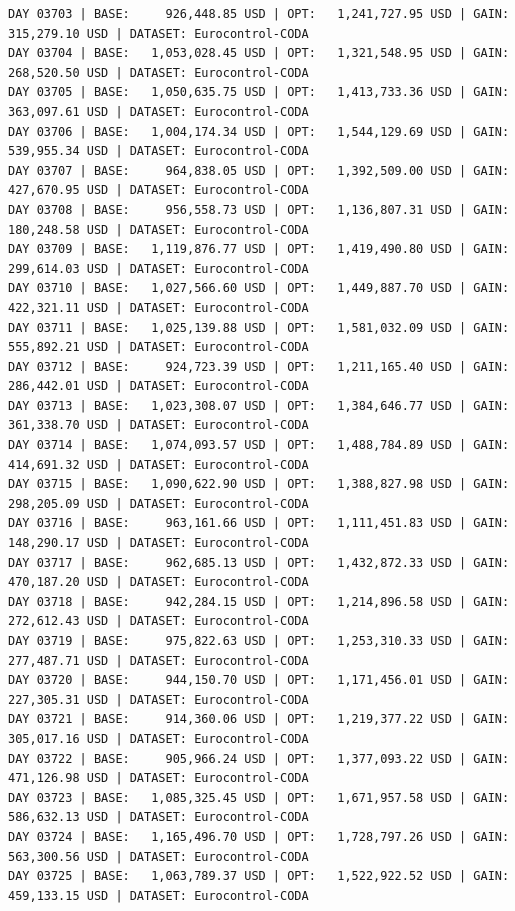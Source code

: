 \documentclass[11pt,a4paper]{article}
\begin{document}
\begin{verbatim}
DAY 03703 | BASE:     926,448.85 USD | OPT:   1,241,727.95 USD | GAIN: 315,279.10 USD | DATASET: Eurocontrol-CODA
DAY 03704 | BASE:   1,053,028.45 USD | OPT:   1,321,548.95 USD | GAIN: 268,520.50 USD | DATASET: Eurocontrol-CODA
DAY 03705 | BASE:   1,050,635.75 USD | OPT:   1,413,733.36 USD | GAIN: 363,097.61 USD | DATASET: Eurocontrol-CODA
DAY 03706 | BASE:   1,004,174.34 USD | OPT:   1,544,129.69 USD | GAIN: 539,955.34 USD | DATASET: Eurocontrol-CODA
DAY 03707 | BASE:     964,838.05 USD | OPT:   1,392,509.00 USD | GAIN: 427,670.95 USD | DATASET: Eurocontrol-CODA
DAY 03708 | BASE:     956,558.73 USD | OPT:   1,136,807.31 USD | GAIN: 180,248.58 USD | DATASET: Eurocontrol-CODA
DAY 03709 | BASE:   1,119,876.77 USD | OPT:   1,419,490.80 USD | GAIN: 299,614.03 USD | DATASET: Eurocontrol-CODA
DAY 03710 | BASE:   1,027,566.60 USD | OPT:   1,449,887.70 USD | GAIN: 422,321.11 USD | DATASET: Eurocontrol-CODA
DAY 03711 | BASE:   1,025,139.88 USD | OPT:   1,581,032.09 USD | GAIN: 555,892.21 USD | DATASET: Eurocontrol-CODA
DAY 03712 | BASE:     924,723.39 USD | OPT:   1,211,165.40 USD | GAIN: 286,442.01 USD | DATASET: Eurocontrol-CODA
DAY 03713 | BASE:   1,023,308.07 USD | OPT:   1,384,646.77 USD | GAIN: 361,338.70 USD | DATASET: Eurocontrol-CODA
DAY 03714 | BASE:   1,074,093.57 USD | OPT:   1,488,784.89 USD | GAIN: 414,691.32 USD | DATASET: Eurocontrol-CODA
DAY 03715 | BASE:   1,090,622.90 USD | OPT:   1,388,827.98 USD | GAIN: 298,205.09 USD | DATASET: Eurocontrol-CODA
DAY 03716 | BASE:     963,161.66 USD | OPT:   1,111,451.83 USD | GAIN: 148,290.17 USD | DATASET: Eurocontrol-CODA
DAY 03717 | BASE:     962,685.13 USD | OPT:   1,432,872.33 USD | GAIN: 470,187.20 USD | DATASET: Eurocontrol-CODA
DAY 03718 | BASE:     942,284.15 USD | OPT:   1,214,896.58 USD | GAIN: 272,612.43 USD | DATASET: Eurocontrol-CODA
DAY 03719 | BASE:     975,822.63 USD | OPT:   1,253,310.33 USD | GAIN: 277,487.71 USD | DATASET: Eurocontrol-CODA
DAY 03720 | BASE:     944,150.70 USD | OPT:   1,171,456.01 USD | GAIN: 227,305.31 USD | DATASET: Eurocontrol-CODA
DAY 03721 | BASE:     914,360.06 USD | OPT:   1,219,377.22 USD | GAIN: 305,017.16 USD | DATASET: Eurocontrol-CODA
DAY 03722 | BASE:     905,966.24 USD | OPT:   1,377,093.22 USD | GAIN: 471,126.98 USD | DATASET: Eurocontrol-CODA
DAY 03723 | BASE:   1,085,325.45 USD | OPT:   1,671,957.58 USD | GAIN: 586,632.13 USD | DATASET: Eurocontrol-CODA
DAY 03724 | BASE:   1,165,496.70 USD | OPT:   1,728,797.26 USD | GAIN: 563,300.56 USD | DATASET: Eurocontrol-CODA
DAY 03725 | BASE:   1,063,789.37 USD | OPT:   1,522,922.52 USD | GAIN: 459,133.15 USD | DATASET: Eurocontrol-CODA

\end{verbatim}
\end{document}
